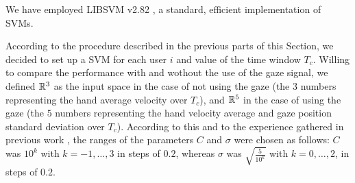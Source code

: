 We have employed LIBSVM v2.82 \cite{ChangL01}, a standard, efficient
implementation of SVMs.

According to the procedure described in the previous parts of this
Section, we decided to set up a SVM for each user $i$ and value of the
time window $T_c$. Willing to compare the performance with and wothout
the use of the gaze signal, we defined $\mathbb{R}^{3}$ as the input space in
the case of not using the gaze (the $3$ numbers representing the hand
average velocity over $T_c$), and $\mathbb{R}^{5}$ in the case of using the
gaze (the $5$ numbers representing the hand velocity average and gaze
position standard deviation over $T_c$). According to this and to the
experience gathered in previous work \cite{clea07}, the ranges of the
parameters $C$ and $\sigma$ were chosen as follows: $C$ was $10^k$
with $k=-1,\ldots,3$ in steps of $0.2$, whereas $\sigma$ was
$\sqrt{\frac{5}{10^{k}}}$ with $k=0,\ldots,2$, in steps of $0.2$.
